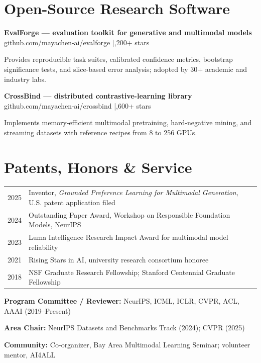 \documentclass[10pt,letterpaper]{article}
\newcommand{\project}[2]{%
  \textbf{#1}\\[-1pt]
  {\small\color{Slate}#2}\par
}
\begin{document}
\section*{Open-Source Research Software}
\project{EvalForge --- evaluation toolkit for generative and multimodal models}{github.com/mayachen-ai/evalforge \;|\; 5,200+ stars}
Provides reproducible task suites, calibrated confidence metrics, bootstrap significance tests, and slice-based error analysis; adopted by 30+ academic and industry labs.
\vspace{4pt}

\project{CrossBind --- distributed contrastive-learning library}{github.com/mayachen-ai/crossbind \;|\; 2,600+ stars}
Implements memory-efficient multimodal pretraining, hard-negative mining, and streaming datasets with reference recipes from 8 to 256 GPUs.

\section*{Patents, Honors \& Service}
\begin{tabularx}{\textwidth}{@{}p{0.67in}X@{}}
2025 & Inventor, \textit{Grounded Preference Learning for Multimodal Generation}, U.S. patent application filed \\
2024 & Outstanding Paper Award, Workshop on Responsible Foundation Models, NeurIPS \\
2023 & Luma Intelligence Research Impact Award for multimodal model reliability \\
2021 & Rising Stars in AI, university research consortium honoree \\
2018 & NSF Graduate Research Fellowship; Stanford Centennial Graduate Fellowship \\
\end{tabularx}

\vspace{2pt}
\textbf{Program Committee / Reviewer:} NeurIPS, ICML, ICLR, CVPR, ACL, AAAI (2019--Present)\par
\textbf{Area Chair:} NeurIPS Datasets and Benchmarks Track (2024); CVPR (2025)\par
\textbf{Community:} Co-organizer, Bay Area Multimodal Learning Seminar; volunteer mentor, AI4ALL

\end{document}
